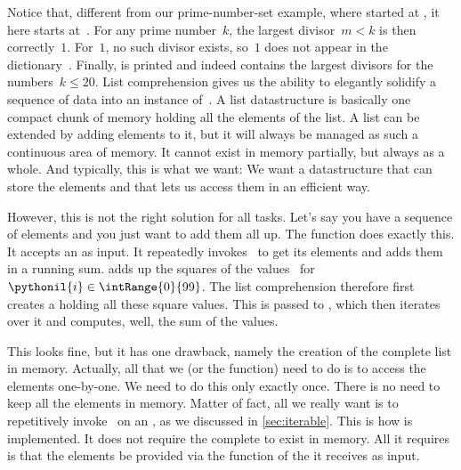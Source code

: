 Notice that, different from our prime-number-set example, where  started at , it here  starts at~.
For any prime number~$k$, the largest divisor~$m<k$ is then correctly~$1$.
For~$1$, no such divisor exists, so~$1$ does not appear in the dictionary~.
Finally,  is printed and indeed contains the largest divisors for the numbers~$k\leq20$.%
%
\FloatBarrier%
\endhsection%
%
%
%
List comprehension gives us the ability to elegantly solidify a sequence of data into an instance of~.
A list datastructure is basically one compact chunk of memory holding all the elements of the list.
A list can be extended by adding elements to it, but it will always be managed as such a continuous area of memory.
It cannot exist in memory partially, but always as a whole.
And typically, this is what we want:
We want a datastructure that can store the elements and that lets us access them in an efficient way.

However, this is not the right solution for all tasks.
Let's say you have a sequence of elements and you just want to add them all up.
The  function does exactly this.
It accepts an  as input.
It repeatedly invokes~ to get its elements and adds them in a running sum.
 adds up the squares of the values~ for~$\pythonil{i}\in\intRange{0}{99}$.
The list comprehension therefore first creates a  holding all these square values.
This  is passed to , which then iterates over it and computes, well, the sum of the values.

This looks fine, but it has one drawback, namely the creation of the complete list in memory.
Actually, all that we (or the  function) need to do is to access the elements one-by-one.
We need to do this only exactly once.
There is no need to keep all the elements in memory.
Matter of fact, all we really want is to repetitively invoke~ on an , as we discussed in \cref{sec:iterable}.
This is how  is implemented.
It does not require the complete  to exist in memory.
All it requires is that the elements be provided via the  function of the  it receives as input.

